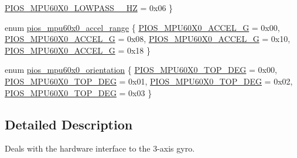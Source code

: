 \begin{DoxyCompactItemize}
\hyperlink{group___p_i_o_s___m_p_u60_x0_ggacce1988bc994f5ade6ac748c2bf0b924a9cc1d8543b5451c433287b70d5265185}{\-P\-I\-O\-S\-\_\-\-M\-P\-U60\-X0\-\_\-\-L\-O\-W\-P\-A\-S\-S\-\_\-\_\-\-H\-Z} =  0x06
 \}
\item 
enum \hyperlink{group___p_i_o_s___m_p_u60_x0_ga8f297bddae3eb43bbf7b54abc6494992}{pios\-\_\-mpu60x0\-\_\-accel\-\_\-range} \{ \hyperlink{group___p_i_o_s___m_p_u60_x0_gga8f297bddae3eb43bbf7b54abc6494992aa0e4d3e7983359d6a4be9b8da4a3975c}{\-P\-I\-O\-S\-\_\-\-M\-P\-U60\-X0\-\_\-\-A\-C\-C\-E\-L\-\_\-G} =  0x00, 
\hyperlink{group___p_i_o_s___m_p_u60_x0_gga8f297bddae3eb43bbf7b54abc6494992a32c252c9136cb59df2e5da3b985d564f}{\-P\-I\-O\-S\-\_\-\-M\-P\-U60\-X0\-\_\-\-A\-C\-C\-E\-L\-\_\-G} =  0x08, 
\hyperlink{group___p_i_o_s___m_p_u60_x0_gga8f297bddae3eb43bbf7b54abc6494992ae5f9e992191f97f3c9281cebf7678db1}{\-P\-I\-O\-S\-\_\-\-M\-P\-U60\-X0\-\_\-\-A\-C\-C\-E\-L\-\_\-G} =  0x10, 
\hyperlink{group___p_i_o_s___m_p_u60_x0_gga8f297bddae3eb43bbf7b54abc6494992acd0d4a72a2500f3189ac87feba6e1751}{\-P\-I\-O\-S\-\_\-\-M\-P\-U60\-X0\-\_\-\-A\-C\-C\-E\-L\-\_\-G} =  0x18
 \}
\item 
enum \hyperlink{group___p_i_o_s___m_p_u60_x0_ga0b97f6902b1564a6eedf92c8937a2a67}{pios\-\_\-mpu60x0\-\_\-orientation} \{ \hyperlink{group___p_i_o_s___m_p_u60_x0_gga0b97f6902b1564a6eedf92c8937a2a67ae79874b7b06bf988c95f1a74fc600b15}{\-P\-I\-O\-S\-\_\-\-M\-P\-U60\-X0\-\_\-\-T\-O\-P\-\_\-D\-E\-G} =  0x00, 
\hyperlink{group___p_i_o_s___m_p_u60_x0_gga0b97f6902b1564a6eedf92c8937a2a67a39bf2dfcfd16651787388e2c1012ce51}{\-P\-I\-O\-S\-\_\-\-M\-P\-U60\-X0\-\_\-\-T\-O\-P\-\_\-D\-E\-G} =  0x01, 
\hyperlink{group___p_i_o_s___m_p_u60_x0_gga0b97f6902b1564a6eedf92c8937a2a67a78ca15e13573b517c5d9e062bbda76a0}{\-P\-I\-O\-S\-\_\-\-M\-P\-U60\-X0\-\_\-\-T\-O\-P\-\_\-D\-E\-G} =  0x02, 
\hyperlink{group___p_i_o_s___m_p_u60_x0_gga0b97f6902b1564a6eedf92c8937a2a67a39826b1efa17eeae681cd584f5713e0c}{\-P\-I\-O\-S\-\_\-\-M\-P\-U60\-X0\-\_\-\-T\-O\-P\-\_\-D\-E\-G} =  0x03
 \}
\end{DoxyCompactItemize}


\subsection{\-Detailed \-Description}
\-Deals with the hardware interface to the 3-\/axis gyro. 

